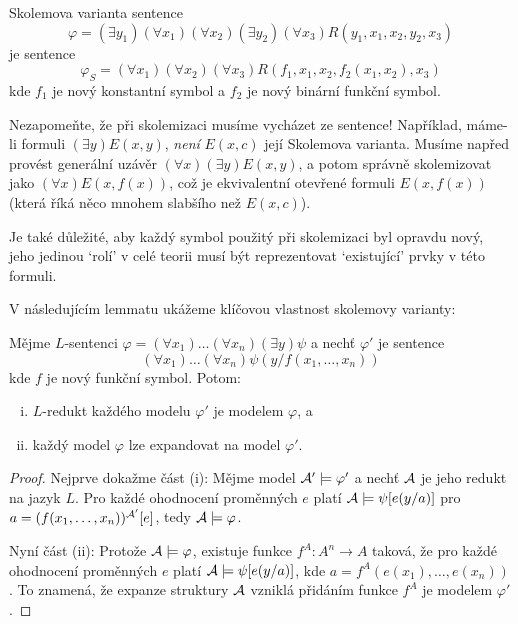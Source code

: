 \begin{example}
    Skolemova varianta sentence
    $$\varphi=(\exists y_1)(\forall x_1)(\forall x_2)(\exists y_2)(\forall x_3)R(y_1,x_1,x_2,y_2,x_3)$$
    je sentence
    $$
    \varphi_S=(\forall x_1)(\forall x_2)(\forall x_3)R(f_1,x_1,x_2,f_2(x_1,x_2),x_3)
    $$
    kde $f_1$ je nový konstantní symbol a $f_2$ je nový binární funkční symbol.
\end{example}

\begin{remark}
    Nezapomeňte, že při skolemizaci musíme vycházet ze sentence! Například, máme-li formuli $(\exists y)E(x,y)$, \emph{není} $E(x,c)$ její Skolemova varianta. Musíme napřed provést generální uzávěr $(\forall x)(\exists y)E(x,y)$, a potom správně skolemizovat jako $(\forall x)E(x,f(x))$, což je ekvivalentní otevřené formuli $E(x,f(x))$ (která říká něco mnohem slabšího než $E(x,c)$).

    Je také důležité, aby každý symbol použitý při skolemizaci byl opravdu nový, jeho jedinou `rolí' v celé teorii musí být reprezentovat `existující' prvky v této formuli.
\end{remark}

V následujícím lemmatu ukážeme klíčovou vlastnost skolemovy varianty:

\begin{lemma}\label{lemma:skolem-variant-conservative-extension}
Mějme $L$-sentenci $\varphi=(\forall x_1)\dots(\forall x_n)(\exists y)\psi$ a nechť $\varphi'$ je sentence
$$
(\forall x_1)\dots(\forall x_n)\psi(y/f(x_1,\dots,x_n))$$
kde $f$ je nový funkční symbol. Potom:
\begin{enumerate}[(i)]
    \item $L$-redukt každého modelu $\varphi'$ je modelem $\varphi$, a
    \item každý model $\varphi$ lze expandovat na model $\varphi'$.
\end{enumerate}
\end{lemma}

\begin{proof}
    Nejprve dokažme část (i): Mějme model $\mathcal{A}'\models\varphi'$ a nechť $\mathcal{A}$ je jeho redukt na jazyk $L$. Pro každé ohodnocení proměnných $e$ platí $\mathcal{A}\models\psi[e(y/a)]$ pro $a=(f(x_1,\dots,x_n))^{\mathcal{A}'}[e]$, tedy $\mathcal{A}\models\varphi$.

    Nyní část (ii): Protože $\mathcal{A}\models\varphi$, existuje funkce $f^A:A^n\to A$ taková, že pro každé ohodnocení proměnných $e$ platí $\mathcal{A}\models \psi[e(y/a)]$, kde $a=f^A(e(x_1),\dots,e(x_n))$. To znamená, že expanze struktury $\mathcal{A}$ vzniklá přidáním funkce $f^A$ je modelem $\varphi'$.
\end{proof}

